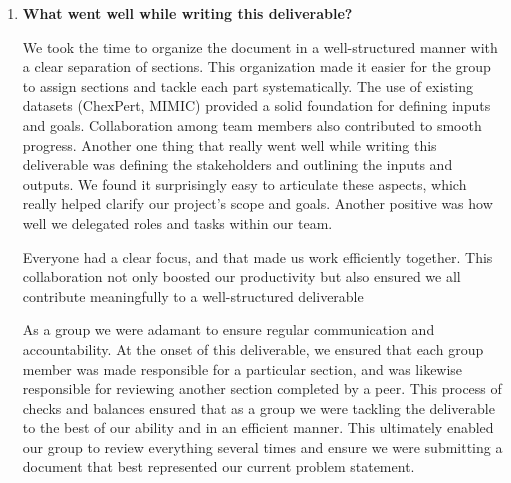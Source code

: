 \documentclass{article}
\begin{document}
\begin{enumerate}
    \item \textbf{What went well while writing this deliverable?} 
    \begin{itemize}
        \begin{item}
            We took the time to organize the document in a well-structured manner with a clear separation of sections. This organization made it easier for the group to assign sections and tackle each part systematically.  The use of existing datasets (ChexPert, MIMIC) provided a solid foundation for defining inputs and goals. Collaboration among team members also contributed to smooth progress. Another one thing that really went well while writing this deliverable was defining the stakeholders and outlining the inputs and outputs. We found it surprisingly easy to articulate these aspects, which really helped clarify our project's scope and goals. Another positive was how well we delegated roles and tasks within our team. 
        \end{item}
        \begin{item}
            Everyone had a clear focus, and that made us work efficiently together. This collaboration not only boosted our productivity but also ensured we all contribute meaningfully to a well-structured deliverable
        \end{item}
        \begin{item}
            As a group we were adamant to ensure regular communication and accountability. At the onset of this deliverable, we ensured that each group member was made responsible for a particular section, and was likewise responsible for reviewing another section completed by a peer. This process of checks and balances ensured that as a group we were tackling the deliverable to the best of our ability and in an efficient manner. This ultimately enabled our group to review everything several times and ensure we were submitting a document that best represented our current problem statement.
        \end{item}
    \end{itemize}


\end{enumerate}
\end{document}
